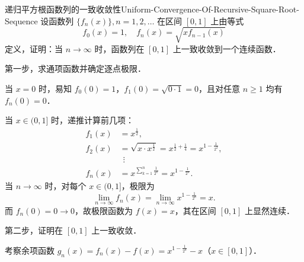 \begin{problem}{递归平方根函数列的一致收敛性}{Uniform-Convergence-Of-Recursive-Square-Root-Sequence}
    设函数列 $\{f_n(x)\}, n = 1, 2, \dots$ 在区间 $[0, 1]$ 上由等式
    \begin{equation}
        f_0(x) = 1, \quad f_n(x) = \sqrt{x f_{n-1}(x)}
    \end{equation}
    定义，证明：当 $n \to \infty$ 时，函数列在 $[0, 1]$ 上一致收敛到一个连续函数．
\end{problem}

\begin{myproof}
    第一步，求通项函数并确定逐点极限．

    当 $x = 0$ 时，易知 $f_0(0) = 1$，$f_1(0) = \sqrt{0 \cdot 1} = 0$，且对任意 $n \geqslant 1$ 均有 $f_n(0) = 0$．

    当 $x \in (0, 1]$ 时，递推计算前几项：
    \begin{equation}
        \begin{aligned}
            f_1(x) & = x^{\frac{1}{2}},                                                                        \\
            f_2(x) & = \sqrt{x \cdot x^{\frac{1}{2}}} = x^{\frac{1}{2} + \frac{1}{4}} = x^{1 - \frac{1}{2^2}}, \\
                   & \ \ \vdots                                                                                \\
            f_n(x) & = x^{\sum_{k=1}^n \frac{1}{2^k}} = x^{1 - \frac{1}{2^n}}.
        \end{aligned}
    \end{equation}
    当 $n \to \infty$ 时，对每个 $x \in (0, 1]$，极限为
    \begin{equation}
        \lim_{n\to\infty} f_n(x) = \lim_{n\to\infty} x^{1 - \frac{1}{2^n}} = x.
    \end{equation}
    而 $f_n(0) = 0 \to 0$，故极限函数为 $f(x) = x$，其在区间 $[0, 1]$ 上显然连续．

    第二步，证明在 $[0, 1]$ 上一致收敛．

    考察余项函数 $g_n(x) = f_n(x) - f(x) = x^{1 - \frac{1}{2^n}} - x$（$x \in [0, 1]$）．


\end{myproof}
